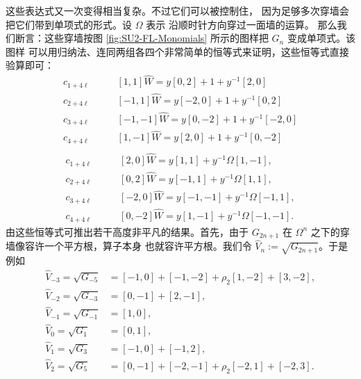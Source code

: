这些表达式又一次变得相当复杂。不过它们可以被控制住，
因为足够多次穿墙会把它们带到单项式的形式。设 $\Omega$ 表示
沿顺时针方向穿过一面墙的运算。
那么我们断言：这些穿墙按图 \ref{fig:SU2-FL-Monomials} 所示的图样把 $G_n$ 变成单项式。该图样
可以用归纳法、连同两组各四个非常简单的恒等式来证明，这些恒等式直接验算即可：
%
\begin{equation}\label{eq:4fold-wilson-idents}
\begin{split}
c_{1 + 4\ell} \qquad  & [1,1]\hat W = y[0,2] + 1 + y^{-1} [2,0] \\
c_{2 + 4\ell} \qquad  & [-1,1]\hat W = y[-2,0] + 1 + y^{-1} [0,2] \\
c_{3 + 4\ell} \qquad  & [-1,-1]\hat W = y[0,-2] + 1 + y^{-1} [-2,0] \\
c_{4 + 4\ell} \qquad  & [1,-1]\hat W = y[2,0] + 1 + y^{-1} [0,-2] \\
\end{split}
\end{equation}
%
%
\begin{equation}
\begin{split}
c_{1 + 4\ell} \qquad  & [2,0]\hat W = y[1,1]  + y^{-1} \Omega[1,-1], \\
c_{2 + 4\ell} \qquad  & [0,2]\hat W = y[-1,1]  + y^{-1} \Omega[1,1], \\
c_{3 + 4\ell} \qquad  & [-2,0]\hat W = y[-1,-1]  + y^{-1} \Omega[-1,1], \\
c_{4 + 4\ell} \qquad  & [0,-2]\hat W = y[1,-1]  + y^{-1} \Omega[-1,-1].
\end{split}
\end{equation}
%
由这些恒等式可推出若干高度非平凡的结果。首先，由于 $G_{2n+1}$
在 $\Omega^n$ 之下的穿墙像容许一个平方根，算子本身
也就容许平方根。我们令 $\hat V_n := \sqrt{G_{2n+1}}$。于是例如
%
\begin{equation}
\begin{split}
\hat V_{-3} = \sqrt{G_{-5}} & = [-1,0] + [-1,-2] + \rho_2 [1,-2] + [3,-2],\\
\hat V_{-2} = \sqrt{G_{-3}} & = [0,-1] + [2,-1],\\
\hat V_{-1} = \sqrt{G_{-1}} & = [1,0],\\
\hat V_0 = \sqrt{G_1} & = [0,1],\\
\hat V_1 = \sqrt{G_3} & =    [-1,0] + [-1,2],\\
\hat V_2 = \sqrt{G_5} & =    [0,-1] + [-2,-1] + \rho_2 [-2,1] + [-2,3].
\end{split}
\end{equation}

